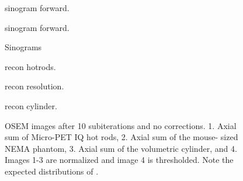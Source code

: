 \documentclass[utf8]{FrontiersinHarvard} %
\begin{document}
\begin{subfigure}
    \centering
    	\setcounter{figure}{4}
	\setcounter{subfigure}{0}
    \begin{minipage}[b]{0.5\textwidth}
        \caption{sinogram forward.}
        \label{fig:sino_forward}
    \end{minipage}  
   
	\setcounter{figure}{4}
	\setcounter{subfigure}{1}
    \begin{minipage}[b]{0.5\textwidth}
        \caption{sinogram forward.}
        \label{fig:sino_simulated}
    \end{minipage}
    
\setcounter{figure}{4}
\setcounter{subfigure}{-1}
\caption{Sinograms}\label{fig:sinograms}
\end{subfigure}


\begin{subfigure}
    \centering
    	\setcounter{figure}{4}
	\setcounter{subfigure}{0}
    \begin{minipage}[b]{0.5\textwidth}
        \caption{recon hotrods.}
        \label{fig:recon_hotrods}
    \end{minipage}  
   
	\setcounter{figure}{4}
	\setcounter{subfigure}{1}
    \begin{minipage}[b]{0.5\textwidth}
        \caption{recon resolution.}
        \label{fig:recon_resolution}
    \end{minipage}
    
    	\setcounter{figure}{4}
	\setcounter{subfigure}{1}
    \begin{minipage}[b]{0.5\textwidth}
        \caption{recon cylinder.}
        \label{fig:recon_cylinder}
    \end{minipage}
    
\setcounter{figure}{4}
\setcounter{subfigure}{-1}
\caption{OSEM images after 10 subiterations and no corrections. 1. Axial sum of Micro-PET IQ hot rods, 2. Axial sum of the mouse- sized NEMA phantom, 3. Axial sum of the volumetric cylinder, and 4.  Images 1-3 are normalized and image 4 is thresholded. Note the expected distributions of .}\label{fig:reconstructions}
\end{subfigure}
\end{document}
